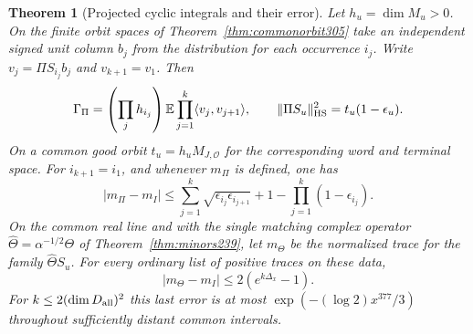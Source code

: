 \documentclass[a4paper,11pt]{article}
\newtheorem{theorem}[proposition]{Theorem}
\theoremstyle{definition}
\theoremstyle{remark}
\numberwithin{equation}{section}
\begin{document}
\begin{theorem}[Projected cyclic integrals and their error]\leavevmode
\label{thm:rowcycles318}
Let \(h_u=\dim M_u>0\). On the finite orbit spaces of
Theorem~\ref{thm:commonorbit305} take an independent signed
unit column \(b_j\) from the distribution for each
occurrence \(i_j\). Write \(v_j=\Pi S_{i_j}b_j\) and
\(v_{k+1}=v_1\). Then
\[
 \Gamma_\Pi=\left(\prod_j h_{i_j}\right)
       \mathbb E\prod_{j=1}^k\langle v_j,v_{j+1}\rangle,
 \qquad
 \|\Pi S_u\|_{\rm HS}^2=t_u(1-\epsilon_u).
\]
On a common good orbit \(t_u=h_u M_{J,\mathcal O}\) for
the corresponding word and terminal space. For
\(i_{k+1}=i_1\), and whenever \(m_\Pi\) is defined, one has
\[
 |m_\Pi-m_I|
 \le \sum_{j=1}^k\sqrt{\epsilon_{i_j}\epsilon_{i_{j+1}}}
               +1-\prod_{j=1}^k(1-\epsilon_{i_j}).
\]
On the common real line and with the single matching
complex operator \(\widehat\Theta=\alpha^{-1/2}\Theta\)
of Theorem~\ref{thm:minors239}, let \(m_\Theta\) be the
normalized trace for the family \(\widehat\Theta S_u\).
For every ordinary list of positive traces on these data,
\[
 |m_\Theta-m_I|\le 2(e^{k\Delta_x}-1).
\]
For \(k\le 2(\dim D_{\rm all})^2\) this last error is at
most \(\exp(-(\log 2)x^{377}/3)\) throughout sufficiently
distant common intervals.
\end{theorem}
\end{document}
